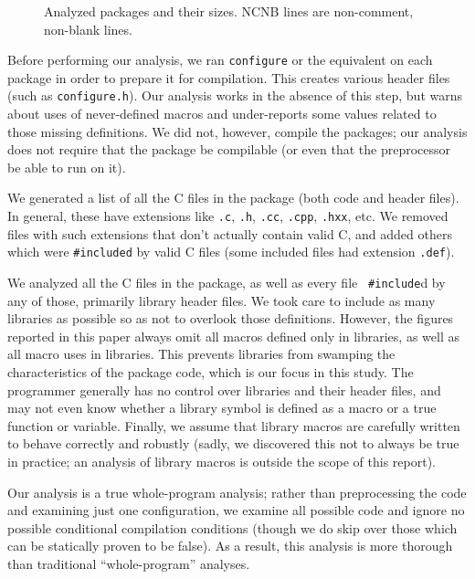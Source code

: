 \documentclass[10pt]{article}
\newcommand{\file}[1]{\texttt{#1}}
\begin{document}
\begin{figure}
\centering
{%
  \small
  \setlength{\tabcolsep}{.25em}
  
}
\caption{Analyzed packages and their sizes.  NCNB lines are non-comment,
  non-blank lines.}
\label{fig:packages}
\end{figure}

Before performing our analysis, we ran {\tt configure} or the equivalent on
each package in order to prepare it for compilation.  This creates various
header files (such as \file{configure.h}).  Our analysis works in the
absence of this step, but warns about uses of never-defined macros and
under-reports some values related to those missing definitions.  We did
not, however, compile the packages; our analysis does not require that the
package be compilable (or even that the preprocessor be able to run on it).

We generated a list of all the C files in the package (both code and header
files).  In general, these have extensions like \file{.c}, \file{.h},
\file{.cc}, \file{.cpp}, \file{.hxx}, etc.  We removed files with such
extensions that don't actually contain valid C, and added others which were
{\tt \#included} by valid C files (some included files had extension
\file{.def}).

We analyzed all the C files in the package, as well as every file {\tt
\#include}d by any of those, primarily library header files.  We
took care to include as many libraries as possible so as not to overlook
those definitions.  However, the figures reported in this paper always omit
all macros defined only in libraries, as well as all macro uses in
libraries.  This prevents libraries from 
swamping the characteristics of the package code, which is our focus in
this study.  The programmer generally has no control over libraries and
their header files, and may not even know whether a library symbol is
defined as a macro or a true function or variable.  Finally, we assume that
library macros are carefully written to behave correctly and robustly
(sadly, we discovered this not to always be true in practice; an
analysis of library macros is outside the scope of this report).

Our analysis is a true whole-program analysis; rather than preprocessing the
code and examining just one configuration, we examine all possible code and
ignore no possible  conditional compilation conditions (though we do skip
over those which can be statically proven to be false).   As a result, this
analysis is more thorough than traditional ``whole-program'' analyses.
\end{document}
